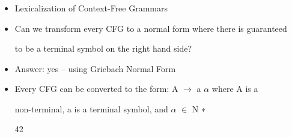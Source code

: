 \documentclass[compress,color=usenames]{beamer}
\begin{document}
\begin{frame}
\frametitle{}

\begin{itemize}
\item

Lexicalization of Context-Free Grammars





\item Can we transform every CFG to a normal form where there is guaranteed


to be a terminal symbol on the right hand side?





\item Answer: yes -- using Griebach Normal Form





\item Every CFG can be converted to the form: A $\rightarrow$ a $\alpha$ where A is a


non-terminal, a is a terminal symbol, and $\alpha$ $\in$ N ∗





42




\end{itemize}

\end{frame}
\end{document}

